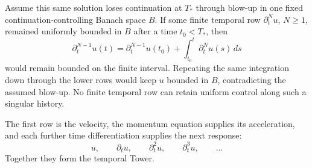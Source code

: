 Assume this same solution loses continuation at \(T_*\) through blow-up in one fixed continuation-controlling Banach space \(B\).
If some finite temporal row \(\partial_t^N u\), \(N\geq1\), remained uniformly bounded in \(B\) after a time \(t_0<T_*\), then
\[
  \partial_t^{N-1}u(t)
  =
  \partial_t^{N-1}u(t_0)
  +
  \int_{t_0}^{t}\partial_t^N u(s)\,ds
\]
would remain bounded on the finite interval.
Repeating the same integration down through the lower rows would keep \(u\) bounded in \(B\), contradicting the assumed blow-up.
No finite temporal row can retain uniform control along such a singular history.

The first row is the velocity, the momentum equation supplies its acceleration, and each further time differentiation supplies the next response:
\[
  u,
  \qquad
  \partial_tu,
  \qquad
  \partial_t^2u,
  \qquad
  \partial_t^3u,
  \qquad
  \ldots
\]
Together they form the temporal Tower.
